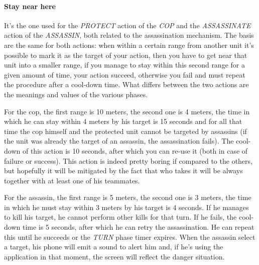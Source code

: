 				\paragraph{Stay near here}
				It's the one used for the \emph{PROTECT} action of the \emph{COP} and the \emph{ASSASSINATE} action of the \emph{ASSASSIN}, both related to the assassination mechanism.
				The basis are the same for both actions: when within a certain range from another unit it's possible to mark it as the target of your action, then you have to get near that unit into a smaller range, if you manage to stay within this second range for a given amount of time, your action succeed, otherwise you fail and must repeat the procedure after a cool-down time.
				What differs between the two actions are the meanings and values of the various phases.
				
				
				For the cop, the first range is 10 meters, the second one is 4 meters, the time in which he can stay within 4 meters by his target is 15 seconds and for all that time the cop himself and the protected unit cannot be targeted by assassins (if the unit was already the target of an assassin, the assassination fails). The cool-down of this action is 10 seconds, after which you can re-use it (both in case of failure or success).
				This action is indeed pretty boring if compared to the others, but hopefully it will be mitigated by the fact that who takes it will be always together with at least one of his teammates.
				
				
				For the assassin, the first range is 5 meters, the second one is 3 meters, the time in which he must stay within 3 meters by his target is 4 seconds. If he manages to kill his target, he cannot perform other kills for that turn. If he fails, the cool-down time is 5 seconds, after which he can retry the assassination. He can repeat this until he succeeds or the \emph{TURN} phase timer expires.
				When the assassin select a target, his phone will emit a sound to alert him and, if he's using the application in that moment, the screen will reflect the danger situation.
				
				
